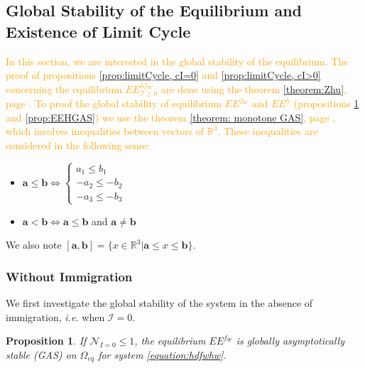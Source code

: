 \documentclass{article}
\newcommand{\cI}{\mathcal{I}}
\newcommand{\R}{\mathbb{R}}
\newcommand{\vdeux}[1]{\textcolor{orange}{#1}}
\newtheorem{prop}[theorem]{Proposition}
\theoremstyle{definition}
\theoremstyle{remark}
\begin{document}
\subsection{Global Stability of the Equilibrium and Existence of Limit Cycle}
\vdeux{
In this section, we are interested in the global stability of the equilibrium. The proof of propositions \ref{prop:limitCycle, cI=0} and \ref{prop:limitCycle, cI>0} concerning the equilibrium $EE^{hf_W}_{\cI \geq 0}$ are done using the theorem \ref{theorem:Zhu}, page \pageref{theorem:Zhu}. To proof the global stability of equilibrium $EE^{f_W}$ and $EE^{h}$ (propositions \ref{prop:EEFGAS} and \ref{prop:EEHGAS}) we use the theorem \ref{theorem: monotone GAS}, page \pageref{theorem: monotone GAS}, which involves inequalities between vectors of $\R^3$. These inequalities are considered in the following sense:}
\begin{itemize}
\item $\mathbf{a} \leq \mathbf{b} \Leftrightarrow \left\lbrace \begin{array}{l} 
a_1 \leq b_1 \\ -a_2 \leq - b_2 \\ -a_3 \leq - b_3
\end{array} \right.$
\item $\mathbf{a} < \mathbf{b} \Leftrightarrow \mathbf{a} \leq \mathbf{b}$ and $\mathbf{a}\neq \mathbf{b}$
\end{itemize}
We also note $[\mathbf{a},\mathbf{b}] = \lbrace x \in \mathbb{R}^3 | \mathbf{a} \leq x \leq \mathbf{b} \rbrace$.



\subsubsection{Without Immigration}
We first investigate the global stability of the system in the absence of immigration, \textit{i.e.} when $\cI = 0$.
\begin{prop}\label{prop:EEFGAS}If $\mathcal{N}_{I =0} \leq 1
$, the equilibrium $EE^{f_W}$ is globally asymptotically stable (GAS) on $\Omega_{eq}$ for system \eqref{equation:hdfwhw}.
\end{prop}
\end{document}
